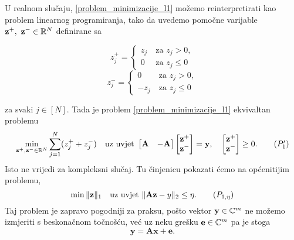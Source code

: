 \documentclass[a4paper,twoside,12pt]{memoir} %
\newcommand{\vect}[1]{\mathbf{#1}}
\renewcommand{\vec}{\vect}
\newcommand{\norm}[1]{\|{#1}\|}
\begin{document}
\indent
U realnom slu\v{c}aju, \eqref{problem_minimizacije_l1} mo\v{z}emo reinterpretirati kao problem linearnog programiranja, tako da uvedemo pomo\v{c}ne varijable $\vec z^+,\ \vec z^- \in \R^N$ definirane sa
\begin{multicols}{2}
    \noindent
    \begin{equation*} 
        z_j^+ = 
        \begin{cases}
            z_j\ & \text{za } z_j > 0, \\
            0\ & \text{za } z_j \leq 0
        \end{cases}
    \end{equation*}
    \begin{equation*} 
        z_j^- = 
        \begin{cases}
            0\ & \text{za } z_j > 0, \\
            -z_j\ & \text{za } z_j \leq 0
        \end{cases}
    \end{equation*}
\end{multicols}
za svaki $j \in [N]$. Tada je problem \eqref{problem_minimizacije_l1} ekvivaltan problemu
\begin{equation}
    \min_{\vec z^+,\vec z^- \\ \in \R^N} \sum_{j=1}^{N}(z_j^+ + z_j^-) \quad \text{uz uvjet }
    \begin{bmatrix*}
        \vec A & -\vec A
    \end{bmatrix*}
    \begin{bmatrix*}
        \vec z^+ \\ \vec z^-
    \end{bmatrix*}
    = \vec y, \quad
    \begin{bmatrix*}
        \vec z^+ \\ \vec z^-
    \end{bmatrix*}
    \geq 0.\tag{$P_1'$}
\end{equation}
Isto ne vrijedi za kompleksni slu\v{c}aj. Tu \v{c}injenicu pokazati \'cemo na op\'{c}enitijim problemu,
\begin{equation}\label{problem_minimizacije_l1_kvadraticni}
    \min \norm{\vec z}_1 \quad \text{uz uvjet } \norm{\vec{Az}-y}_2 \leq \eta.\tag{$P_{1,\eta}$}
\end{equation}
Taj problem je zapravo pogodniji za praksu, po\v{s}to vektor $\vec y \in \C^m$ ne mo\v{z}emo izmjeriti s beskona\v{c}nom to\v{c}no\v{s}\'cu, ve\'c uz neku gre\v{s}ku $\vec e \in \C^m$ pa je stoga
\begin{equation*}
    \vec y = \vec{Ax} + \vec e. 
\end{equation*}
\end{document}
